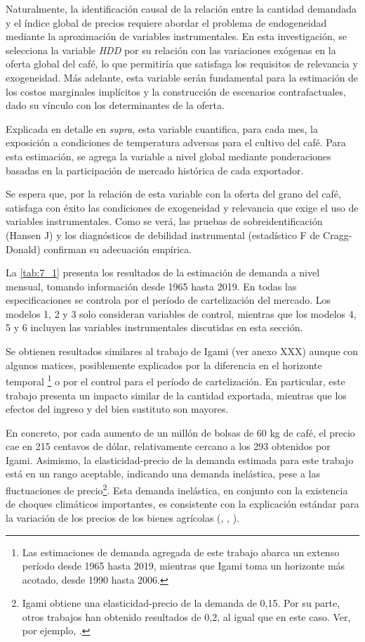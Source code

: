 Naturalmente, la identificación causal de la relación entre la cantidad demandada y el índice global de precios requiere abordar el problema de endogeneidad mediante la aproximación de variables instrumentales. En esta investigación, se selecciona la variable \textit{HDD} por su relación con las variaciones exógenas en la oferta global del café, lo que permitiría que satisfaga los requisitos de relevancia y exogeneidad. Más adelante, esta variable serán fundamental para la estimación de los costos marginales implícitos y la construcción de escenarios contrafactuales, dado su vínculo con los determinantes de la oferta.

Explicada en detalle en \textit{supra}, esta variable cuantifica, para cada mes, la exposición a condiciones de temperatura adversas para el cultivo del café. Para esta estimación, se agrega la variable a nivel global mediante ponderaciones basadas en la participación de mercado histórica de cada exportador.

Se espera que, por la relación de esta variable con la oferta del grano del café, satisfaga con éxito las condiciones de exogeneidad y relevancia que exige el uso de variables instrumentales. Como se verá, las pruebas de sobreidentificación (Hansen J) y los diagnósticos de debilidad instrumental (estadístico F de Cragg-Donald) confirman su adecuación empírica.

La \ref{tab:7_1} presenta los resultados de la estimación de demanda a nivel mensual, tomando información desde 1965 hasta 2019. En todas las especificaciones se controla por el período de cartelización del mercado. Los modelos 1, 2 y 3 solo consideran variables de control, mientras que los modelos 4, 5 y 6 incluyen las variables instrumentales discutidas en esta sección.

Se obtienen resultados similares al trabajo de Igami (ver anexo XXX) aunque con algunos matices, posiblemente explicados por la diferencia en el horizonte temporal \footnote{Las estimaciones de demanda agregada de este trabajo abarca un extenso período desde 1965 hasta 2019, mientras que Igami toma un horizonte más acotado, desde 1990 hasta 2006.} o por el control para el período de cartelización. En particular, este trabajo presenta un impacto similar de la cantidad exportada, mientras que los efectos del ingreso y del bien sustituto son mayores.

En concreto, por cada aumento de un millón de bolsas de 60 kg de café, el precio cae en 215 centavos de dólar, relativamente cercano a los 293 obtenidos por Igami. Asimismo, la elasticidad-precio de la demanda estimada para este trabajo está en un rango aceptable, indicando una demanda inelástica, pese a las fluctuaciones de precio\footnote{Igami obtiene una elasticidad-precio de la demanda de 0,15. Por su parte, otros trabajos han obtenido resultados de 0,2, al igual que en este caso. Ver, por ejemplo, \cite{bates1997open}.}. Esta demanda inelástica, en conjunto con la existencia de choques climáticos importantes, es consistente con la explicación estándar para la variación de los precios de los bienes agrícolas (\cite{deaton1992behaviour}, \cite{prebisch1959}, \cite{singer1950}).


